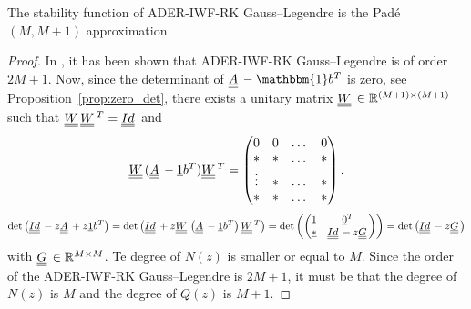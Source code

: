 \begin{theorem}\label{th:pade_GLG}
	The stability function  of ADER-IWF-RK Gauss--Legendre is  the Pad\'e$(M,M+1)$ approximation.
\end{theorem}
\begin{proof}
	In \cite[Theorem 3.9]{veiga2023improving}, it has been shown that ADER-IWF-RK Gauss--Legendre is of order $2M+1$.
	Now, since the determinant of $\mat{A}-\mathbbm{1}b^T$ is zero, see Proposition~\ref{prop:zero_det}, there exists a unitary matrix $\mat{W} \in \R^{(M+1)\times (M+1)}$ such that $\mat{W}\mat{W}^T=\mat{Id}$ and
	\begin{equation}
	\mat{W} (\mat{A} -\vec{1}b^T )\mat{W}^T = \begin{pmatrix}
	0 & 0 & \dots &0\\
	* & * &  \dots &*\\
	\vdots & * &  \dots &*\\
	* & * &  \dots &*
	\end{pmatrix}. 
	\end{equation}
	\begin{align}
	\det\left(\mat{Id}-z\mat{A}+z\vec{1}b^T \right) = \det\left(\mat{Id}+z \mat{W} \left( \mat{A}-\vec{1}b^T\right)\mat{W}^T \right)= \det\left(\begin{pmatrix}
	1 & \underline{0}^T \\
	\underline{*} & \mat{Id}-z \mat{G} 
	\end{pmatrix}\right) = \det\left(\mat{Id}-z \mat{G} \right)
	\end{align}
	with $\mat{G}\in \R^{M\times M}$. Te degree of $N(z)$ is smaller or equal to $M$. Since the order of the ADER-IWF-RK Gauss--Legendre is $2M+1$, it must be that the degree of $N(z)$ is $M$ and the degree of $Q(z)$ is $M+1$.
\end{proof}

